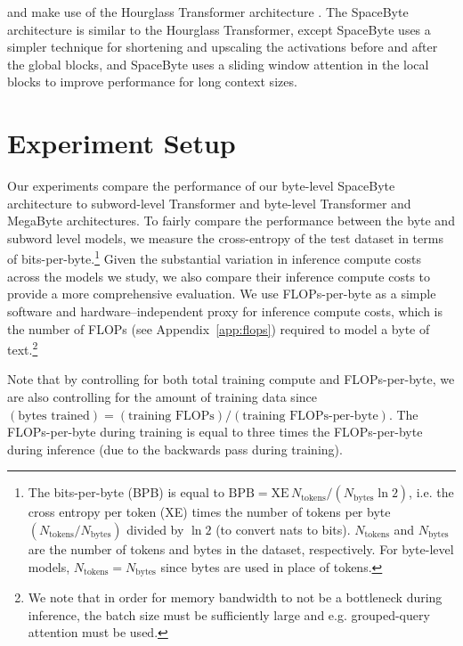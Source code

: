 \citet{nawrot2022pooling} and \citet{Fleshman2023Toucan} make use of the Hourglass Transformer architecture \cite{nawrot2022hierarchical}. The SpaceByte architecture is similar to the Hourglass Transformer, except SpaceByte uses a simpler technique for shortening and upscaling the activations before and after the global blocks, and SpaceByte uses a sliding window attention \cite{longformer2020,child2019sparse,press2021shortformer} in the local blocks to improve performance for long context sizes.

\section{Experiment Setup}
\label{sec:setup}

Our experiments compare the performance of our byte-level SpaceByte architecture to subword-level Transformer and byte-level Transformer and MegaByte architectures. To fairly compare the performance between the byte and subword level models, we measure the cross-entropy of the test dataset in terms of bits-per-byte.\footnote{
    The bits-per-byte (BPB) is equal to
      $\text{BPB} = \text{XE} \, N_\text{tokens} / (N_\text{bytes} \ln2)$, i.e. the cross entropy per token (XE) times the number of tokens per byte $(N_\text{tokens} / N_\text{bytes})$
      divided by $\ln2$ (to convert nats to bits).
    $N_\text{tokens}$ and $N_\text{bytes}$ are the number of tokens and bytes in the dataset, respectively. For byte-level models, $N_\text{tokens} = N_\text{bytes}$ since bytes are used in place of tokens.\label{foot:BPB}}
Given the substantial variation in inference compute costs across the models we study, we also compare their inference compute costs to provide a more comprehensive evaluation. We use FLOPs-per-byte as a simple software and hardware--independent proxy for inference compute costs, which is the number of FLOPs (see Appendix~\ref{app:flops}) required to model a byte of text.\footnote{
    We note that in order for memory bandwidth to not be a bottleneck during inference, the batch size must be sufficiently large and e.g. grouped-query attention \cite{shazeer2019mqa,ainslie2023gqa} must be used.}

Note that by controlling for both total training compute and FLOPs-per-byte, we are also controlling for the amount of training data since
  $(\text{bytes trained}) = (\text{training FLOPs})/(\text{training FLOPs-per-byte})$. The FLOPs-per-byte during training is equal to three times the FLOPs-per-byte during inference (due to the backwards pass during training).

